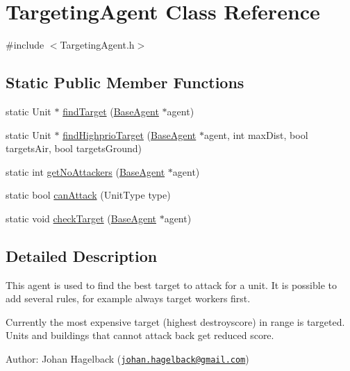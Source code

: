 \hypertarget{class_targeting_agent}{\section{Targeting\-Agent Class Reference}
\label{class_targeting_agent}
}


{\ttfamily \#include $<$Targeting\-Agent.\-h$>$}

\subsection*{Static Public Member Functions}
\begin{DoxyCompactItemize}
\item 
static Unit $\ast$ \hyperlink{class_targeting_agent_af64e1eb357531a4e57d77413f2f41cf1}{find\-Target} (\hyperlink{class_base_agent}{Base\-Agent} $\ast$agent)
\item 
static Unit $\ast$ \hyperlink{class_targeting_agent_abda361d9cdedb44ae096969c751daf2e}{find\-Highprio\-Target} (\hyperlink{class_base_agent}{Base\-Agent} $\ast$agent, int max\-Dist, bool targets\-Air, bool targets\-Ground)
\item 
static int \hyperlink{class_targeting_agent_a2659b2a46aaca41b4801bc6318d264b3}{get\-No\-Attackers} (\hyperlink{class_base_agent}{Base\-Agent} $\ast$agent)
\item 
static bool \hyperlink{class_targeting_agent_a79d397e7e2461c9993a2d9105438d1c3}{can\-Attack} (Unit\-Type type)
\item 
static void \hyperlink{class_targeting_agent_a90caf961f17a2088e7863249acfd846d}{check\-Target} (\hyperlink{class_base_agent}{Base\-Agent} $\ast$agent)
\end{DoxyCompactItemize}


\subsection{Detailed Description}
This agent is used to find the best target to attack for a unit. It is possible to add several rules, for example always target workers first.

Currently the most expensive target (highest destroyscore) in range is targeted. Units and buildings that cannot attack back get reduced score.

Author\-: Johan Hagelback (\href{mailto:johan.hagelback@gmail.com}{\tt johan.\-hagelback@gmail.\-com}) 

